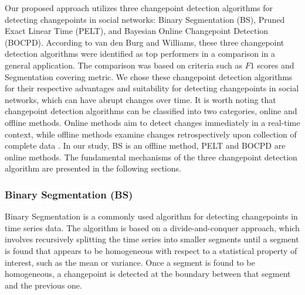 \documentclass[]{interact}
\theoremstyle{plain}%
\theoremstyle{definition}
\theoremstyle{remark}
\begin{document}
{	Our proposed approach utilizes three changepoint detection algorithms for detecting changepoints in social networks: Binary Segmentation (BS), Pruned Exact Linear Time (PELT), and Bayesian Online Changepoint Detection (BOCPD). According to van den Burg and Williams\cite{burgEvaluationChangePoint2022}, these three changepoint detection algorithms were identified as top performers in a comparison in a general application. The comparison was based on criteria such as $F1$ scores and Segmentation covering metric. We chose these changepoint detection algorithms for their respective advantages and suitability for detecting changepoints in social networks, which can have abrupt changes over time. It is worth noting that changepoint detection algorithms can be classified into two categories, online and offline methods. Online methods aim to detect changes immediately in a real-time context, while offline methods examine changes retrospectively upon collection of complete data \cite{kendrickChangePointDetection2018}. In our study, BS is an offline method, PELT and BOCPD are online methods. The fundamental mechanisms of the three changepoint detection algorithm are presented in the following sections.
	
	\subsubsection{Binary Segmentation (BS)} \label{sec:BS}
	
	
	\hspace{0.28cm} Binary Segmentation is a commonly used algorithm for detecting changepoints in time series data. The algorithm is based on a divide-and-conquer approach, which involves recursively splitting the time series into smaller segments until a segment is found that appears to be homogeneous with respect to a statistical property of interest, such as the mean or variance. Once a segment is found to be homogeneous, a changepoint is detected at the boundary between that segment and the previous one\cite{killickOptimalDetectionChangepoints2012}. \\
	
}
\end{document}
